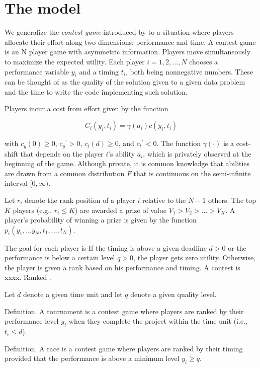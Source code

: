 \documentclass[12pt,]{article}
\begin{document}
\section{The model}\label{the-model}

We generalize the \emph{contest game} introduced by
\citet{moldovanu2001optimal} to a situation where players allocate their
effort along two dimensions: performance and time. A contest game is an
N player game with asymmetric information. Players move simultaneously
to maximize the expected utility. Each player \(i=1, 2, ..., N\) chooses
a performance variable \(y_i\) and a timing \(t_i\), both being
nonnegative numbers. These can be thought of as the quality of the
solution given to a given data problem and the time to write the code
implementing such solution.

Players incur a cost from effort given by the function

\begin{equation}
  C_i(y_i, t_i) = \gamma(a_i)c(y_i, t_i)
\end{equation}

with \({c_{y}}(0)\geq 0\), \({c_{y}}^\prime>0\), \({c_{t}}(d)\geq 0\),
and \({c_{t}}^\prime<0\). The function \(\gamma(\cdot)\) is a cost-shift
that depends on the player \(i\)'s ability \(a_i\), which is privately
observed at the beginning of the game. Although private, it is common
knowledge that abilities are drawn from a common distribution \(F\) that
is continuous on the semi-infinite interval \([0,\infty)\).

Let \(r_i\) denote the rank position of a player \(i\) relative to the
\(N-1\) others. The top \(K\) players (e.g., \(r_i\leq K\)) are awarded
a prize of value \(V_1 > V_2 > ... > V_K\). A player's probability of
winning a prize is given by the function
\(p_i(y_1,...y_N, t_1, ..., t_N)\).

The goal for each player is If the timing is above a given deadline
\(d>0\) or the performance is below a certain level \(q>0\), the player
gets zero utility. Otherwise, the player is given a rank based on his
performance and timing. A contest is xxxx. Ranked .

Let \(d\) denote a given time unit and let \(q\) denote a given quality
level.

Definition. A tournament is a contest game where players are ranked by
their performance level \(y_i\) when they complete the project within
the time unit (i.e., \(t_i \leq d\)).

Definition. A race is a contest game where players are ranked by their
timing provided that the performance is above a minimum level
\(y_i\geq q\).
\end{document}
